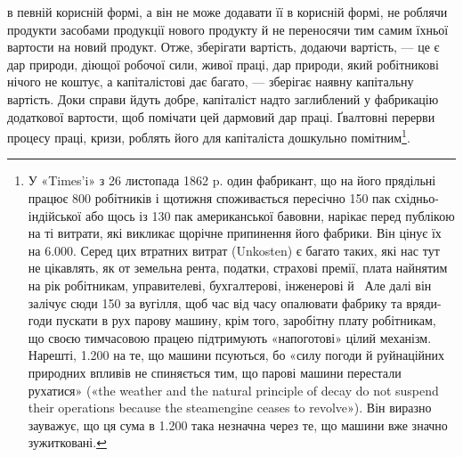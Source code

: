 \parcont{}  %
в певній корисній формі, а він не може додавати її в корисній
формі, не роблячи продукти засобами продукції нового продукту
й не переносячи тим самим їхньої вартости на новий продукт.
Отже, зберігати вартість, додаючи вартість, — це є дар природи,
діющої робочої сили, живої праці, дар природи, який робітникові
нічого не коштує, а капіталістові дає багато, — зберігає наявну
капітальну вартість.  Доки справи йдуть добре, капіталіст
надто заглиблений у фабрикацію додаткової вартости, щоб помічати
цей дармовий дар праці. Ґвалтовні перерви процесу праці,
кризи, роблять його для капіталіста дошкульно помітним\footnote{
У «Times’i» з 26 листопада 1862 p. один фабрикант, що на його
прядільні працює 800 робітників і щотижня споживається пересічно 150 пак
східньо-індійської або щось із 130 пак американської бавовни, нарікає
перед публікою на ті витрати, які викликає щорічне припинення його
фабрики. Він цінує їх на \num{6.000}. Серед цих втратних
витрат (Unkosten) є багато таких, які нас тут не цікавлять, як от земельна
рента, податки, страхові премії, плата найнятим на рік робітникам, управителеві,
бухгалтерові, інженерові й~ Але далі він залічує сюди
150 за вугілля, щоб час від часу опалювати фабрику та
вряди-годи пускати в рух парову машину, крім того, заробітну плату
робітникам, що своєю тимчасовою працею підтримують «напоготові»
цілий механізм. Нарешті, \num{1.200} на те, що машини псуються,
бо «силу погоди й руйнаційних природних впливів не спиняється
тим, що парові машини перестали рухатися» («the weather and the natural
principle of decay do not suspend their operations because the steamengine
ceases to revolve»). Він виразно зауважує, що ця сума в \num{1.200} така незначна через те, що машини вже значно зужитковані.
}.

